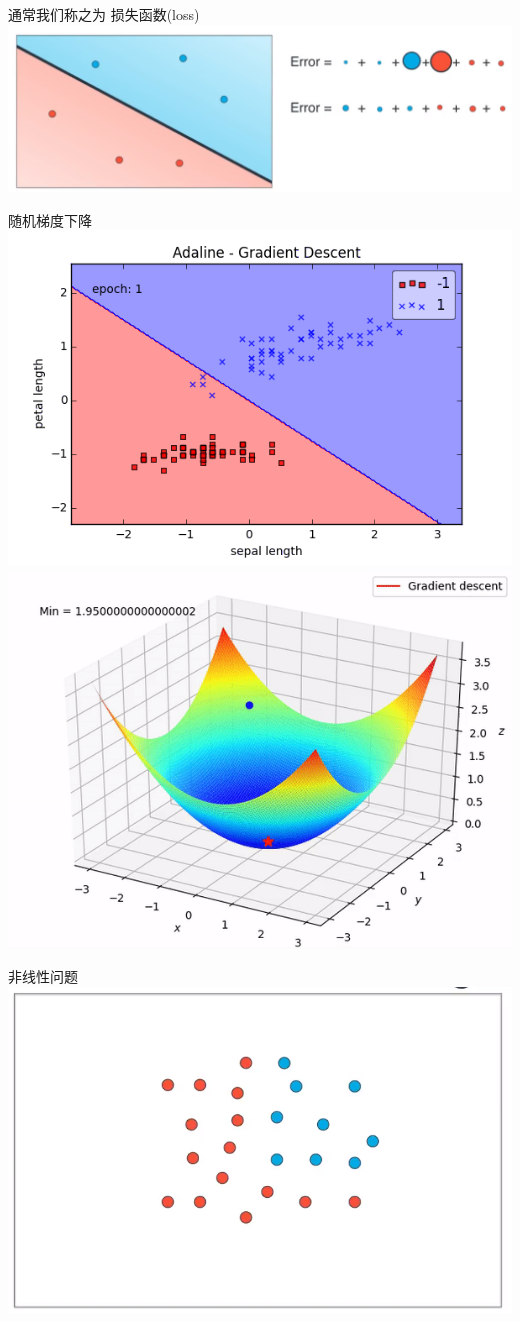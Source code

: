 \documentclass[11pt]{article}
\makeatletter
\def\maxwidth{\ifdim\Gin@nat@width>\linewidth\linewidth
    \else\Gin@nat@width\fi}
\let\Oldincludegraphics\includegraphics
\renewcommand{\includegraphics}[1]{\Oldincludegraphics[width=.8\maxwidth]{#1}}
\makeatother
\begin{document}
    通常我们称之为 损失函数(loss) \includegraphics{img/error.png}

    随机梯度下降 \includegraphics{img/perceptron_animation.gif}
\includegraphics{img/fig5.gif}

    非线性问题 \includegraphics{img/nonlinear.png}
\end{document}
